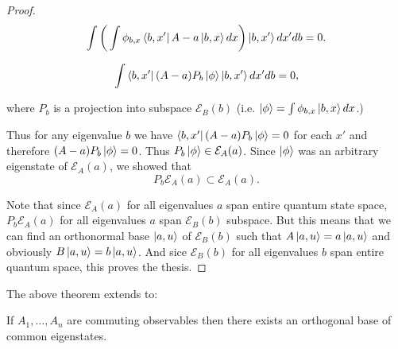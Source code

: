\documentclass[main.tex]{subfiles}
\begin{document}
\begin{proof}
\begin{equation}
\int \bigg(\int \phi_{b, x} \bra{b, x'} A - a \ket{b, x}dx\bigg)  \ket{b, x'} d x' db = 0.
\end{equation}

\begin{equation}
\int \bra{b, x'} (A - a)P_b \ket{\phi} \ket{b, x'} d x' db = 0,
\end{equation}

where $P_b$ is a projection into subspace $\mathcal{E}_B(b)$ (i.e.  $\ket{\phi} = \int \phi_{b, x} \ket{b, x}dx$.)

Thus for any eigenvalue $b$ we have $\bra{b, x'} (A - a)P_b \ket{\phi} = 0$ for each $x'$ and therefore $(A - a)P_b \ket{\phi} = 0$. Thus $P_b \ket{\phi}\in \mathcal{E}_A(a)$.
Since $\ket{\phi}$ was an arbitrary eigenstate of $\mathcal{E}_A(a)$, we showed that
\begin{equation}
P_b \mathcal{E}_A(a) \subset \mathcal{E}_A(a). 
\end{equation} 

Note that since $\mathcal{E}_A(a)$ for all eigenvalues $a$ span entire quantum state space, $P_b \mathcal{E}_A(a)$ for all eigenvalues $a$ span $\mathcal{E}_B(b)$ subspace. But this means that we can find an orthonormal base $\ket{a,u}$ of $\mathcal{E}_B(b)$ such that $A \ket{a,u} = a \ket{a,u}$ and obviously $B \ket{a,u} = b \ket{a,u}$. And sice $\mathcal{E}_B(b)$ for all eigenvalues $b$ span entire quantum space, this proves the thesis.

\end{proof}

The above theorem extends to: 

\begin{theorem}
If $A_1, \dots, A_n$ are commuting observables then there exists an orthogonal base of common eigenstates.
\end{theorem}
  
\end{document}
